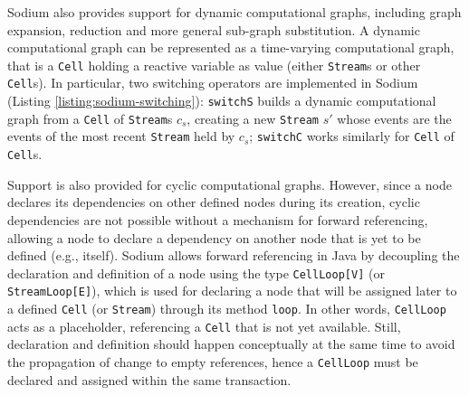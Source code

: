 

Sodium also provides support for dynamic computational graphs, including graph
expansion, reduction and more general sub-graph substitution. A dynamic
computational graph can be represented as a time-varying computational graph,
that is a \texttt{Cell} holding a reactive variable as value (either
\texttt{Stream}s or other \texttt{Cell}s). In particular, two switching
operators are implemented in Sodium (Listing \ref{listing:sodium-switching}):
\texttt{switchS} builds a dynamic computational graph from a \texttt{Cell} of
\texttt{Stream}s $c_s$, creating a new \texttt{Stream} $s'$ whose events are
the events of the most recent \texttt{Stream} held by $c_s$; \texttt{switchC}
works similarly for \texttt{Cell} of \texttt{Cell}s.



Support is also provided for cyclic computational graphs. However, since a node
declares its dependencies on other defined nodes during its creation, cyclic
dependencies are not possible without a mechanism for forward referencing,
allowing a node to declare a dependency on another node that is yet to be
defined (e.g., itself). Sodium allows forward referencing in Java by decoupling
the declaration and definition of a node using the type \texttt{CellLoop[V]}
(or \texttt{StreamLoop[E]}), which is used for declaring a node that will be
assigned later to a defined \texttt{Cell} (or \texttt{Stream}) through its
method \texttt{loop}. In other words, \texttt{CellLoop} acts as a placeholder,
referencing a \texttt{Cell} that is not yet available. Still, declaration and
definition should happen conceptually at the same time to avoid the propagation
of change to empty references, hence a \texttt{CellLoop} must be declared and
assigned within the same transaction.



